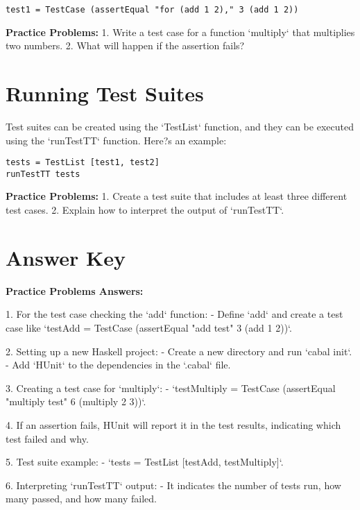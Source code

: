 \documentclass{article}
\begin{document}
\begin{verbatim}
test1 = TestCase (assertEqual "for (add 1 2)," 3 (add 1 2))
\end{verbatim}

\textbf{Practice Problems:}
1. Write a test case for a function `multiply` that multiplies two numbers.
2. What will happen if the assertion fails?

\section*{Running Test Suites}
Test suites can be created using the `TestList` function, and they can be executed using the `runTestTT` function. Here?s an example:

\begin{verbatim}
tests = TestList [test1, test2]
runTestTT tests
\end{verbatim}

\textbf{Practice Problems:}
1. Create a test suite that includes at least three different test cases.
2. Explain how to interpret the output of `runTestTT`.

\section*{Answer Key}
\textbf{Practice Problems Answers:}

1. For the test case checking the `add` function:
   - Define `add` and create a test case like `testAdd = TestCase (assertEqual "add test" 3 (add 1 2))`.
  
2. Setting up a new Haskell project:
   - Create a new directory and run `cabal init`.
   - Add `HUnit` to the dependencies in the `.cabal` file.
  
3. Creating a test case for `multiply`:
   - `testMultiply = TestCase (assertEqual "multiply test" 6 (multiply 2 3))`.

4. If an assertion fails, HUnit will report it in the test results, indicating which test failed and why.

5. Test suite example:
   - `tests = TestList [testAdd, testMultiply]`.

6. Interpreting `runTestTT` output:
   - It indicates the number of tests run, how many passed, and how many failed.
\end{document}
